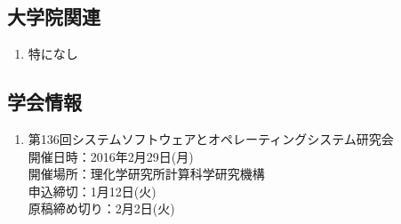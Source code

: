 \documentclass[fleqn, 14pt]{extarticle}
\begin{document}
    \subsection{大学院関連}
    \begin{enumerate}

        \item 特になし
            \hfill
            \label{enum-17}

    \end{enumerate}
    \subsection{学会情報} 
    \begin{enumerate}
        \item 第136回システムソフトウェアとオペレーティングシステム研究会\\
            開催日時：2016年2月29日(月)\\
            開催場所：理化学研究所計算科学研究機構\\
            申込締切：1月12日(火)\\
            原稿締め切り：2月2日(火)\\
    \end{enumerate}

    
\end{document}
